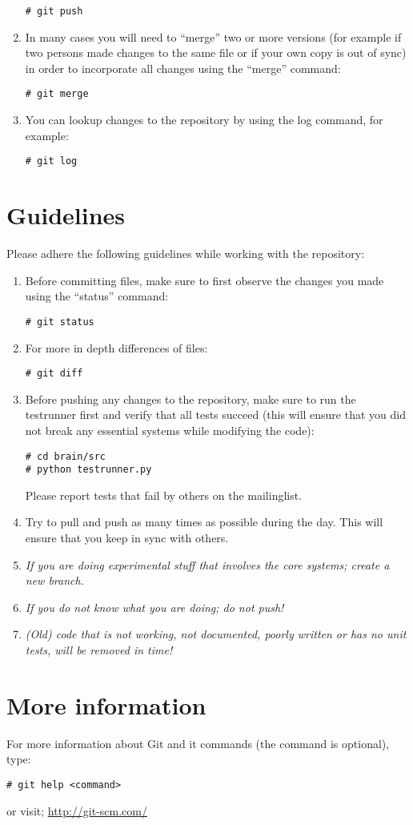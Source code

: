 \documentclass[a4paper, 10pt]{article}
\begin{document}
\begin{enumerate}
\begin{lstlisting}
# git push
\end{lstlisting}
    \item In many cases you will need to ``merge'' two or more versions (for example if two persons made changes to the same file or if your own copy is out of sync) in order to incorporate all changes using the ``merge'' command:
\begin{lstlisting}
# git merge
\end{lstlisting}
    \item You can lookup changes to the repository by using the log command, for example:
\begin{lstlisting}
# git log
\end{lstlisting}
\end{enumerate}

\section{Guidelines}

Please adhere the following guidelines while working with the repository:
\begin{enumerate}
    \item Before committing files, make sure to first observe the changes you made using the ``status'' command:
\begin{lstlisting}
# git status
\end{lstlisting}
    \item For more in depth differences of files:
\begin{lstlisting}
# git diff
\end{lstlisting}
    \item Before pushing any changes to the repository, make sure to run the testrunner first and verify that all tests succeed (this will ensure that you did not break any essential systems while modifying the code):
\begin{lstlisting}
# cd brain/src
# python testrunner.py
\end{lstlisting}
    Please report tests that fail by others on the mailinglist.
    \item Try to pull and push as many times as possible during the day. This will ensure that you keep in sync with others. 
    \item \emph{If you are doing experimental stuff that involves the core systems; create a new branch.}
    \item \emph{If you do not know what you are doing; do not push!}
    \item \emph{(Old) code that is not working, not documented, poorly written or has no unit tests, will be removed in time!}
\end{enumerate}

\section{More information}
For more information about Git and it commands (the command is optional), type:
\begin{lstlisting}
# git help <command>
\end{lstlisting}
or visit;
\url{http://git-scm.com/}
\end{document}

